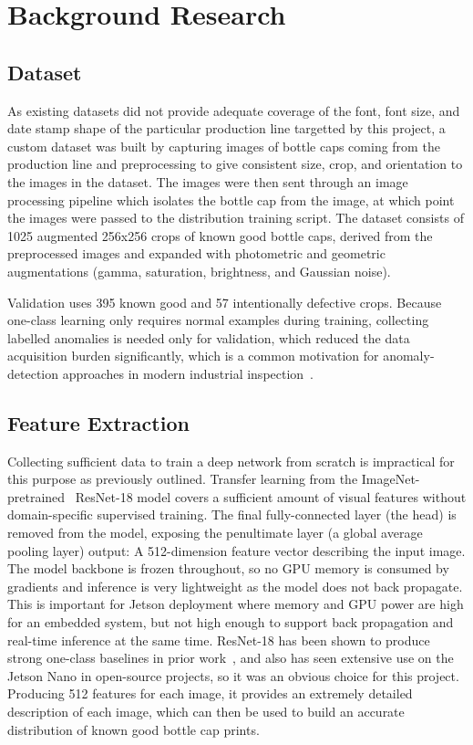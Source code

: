 \documentclass[conference]{IEEEtran}
\begin{document}
\section{Background Research}
\subsection{Dataset}
As existing datasets did not provide adequate coverage of the font, font size, and date stamp shape of the particular production line targetted by this project, a custom dataset was built by capturing images of bottle caps coming from the production line and preprocessing to give consistent size, crop, and orientation to the images in the dataset. The images were then sent through an image processing pipeline which isolates the bottle cap from the image, at which point the images were passed to the distribution training script. The dataset consists of 1025 augmented 256x256 crops of known good bottle caps, derived from the preprocessed images and expanded with photometric and geometric augmentations (gamma, saturation, brightness, and Gaussian noise).

Validation uses 395 known good and 57 intentionally defective crops. Because one-class learning only requires normal examples during training, collecting labelled anomalies is needed only for validation, which reduced the data acquisition burden significantly, which is a common motivation for anomaly-detection approaches in modern industrial inspection~\cite{bergmann2019mvtec}.

\subsection{Feature Extraction}
Collecting sufficient data to train a deep network from scratch is impractical for this purpose as previously outlined. Transfer learning from the ImageNet-pretrained~\cite{imagenet} ResNet-18 model covers a sufficient amount of visual features without domain-specific supervised training. The final fully-connected layer (the head) is removed from the model, exposing the penultimate layer (a global average pooling layer) output: A 512-dimension feature vector describing the input image. The model backbone is frozen throughout, so no GPU memory is consumed by gradients and inference is very lightweight as the model does not back propagate. This is important for Jetson
deployment where memory and GPU power are high for an embedded system, but not high enough to support back propagation and real-time inference at the same time. ResNet-18 has been shown to produce strong one-class baselines in prior work~\cite{roth2022towards,defard2021padim}, and also has seen extensive use on the Jetson Nano in open-source projects, so it was an obvious choice for this project. Producing 512 features for each image, it provides an extremely detailed description of each image, which can then be used to build an accurate distribution of known good bottle cap prints.
\end{document}
